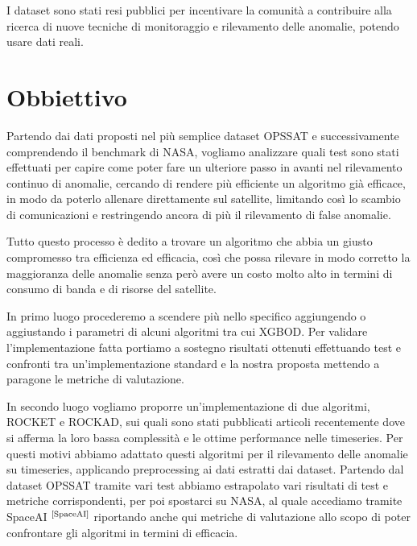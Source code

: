 I dataset sono stati resi pubblici per incentivare la comunità a contribuire alla ricerca di nuove tecniche di monitoraggio e rilevamento delle anomalie, potendo usare dati reali.

\section{Obbiettivo}
Partendo dai dati proposti nel più semplice dataset OPS\textunderscore SAT e successivamente comprendendo il benchmark di NASA, vogliamo analizzare quali test sono stati effettuati per capire come poter fare un ulteriore passo in avanti nel rilevamento continuo di anomalie, cercando di rendere più efficiente un algoritmo già efficace, in modo da poterlo allenare direttamente sul satellite, limitando così lo scambio di comunicazioni e restringendo ancora di più il rilevamento di false anomalie.

Tutto questo processo è dedito a trovare un algoritmo che abbia un giusto compromesso tra efficienza ed efficacia, così che possa rilevare in modo corretto la maggioranza delle anomalie senza però avere un costo molto alto in termini di consumo di banda e di risorse del satellite.

In primo luogo procederemo a scendere più nello specifico aggiungendo o aggiustando i parametri di alcuni algoritmi tra cui XGBOD.
Per validare l'implementazione fatta portiamo a sostegno risultati ottenuti effettuando test e confronti tra un'implementazione standard e la nostra proposta mettendo a paragone le metriche di valutazione.

In secondo luogo vogliamo proporre un'implementazione di due algoritmi, ROCKET e ROCKAD, sui quali sono stati pubblicati articoli recentemente dove si afferma la loro bassa complessità e le ottime performance nelle timeseries.
Per questi motivi abbiamo adattato questi algoritmi per il rilevamento delle anomalie su timeseries, applicando preprocessing ai dati estratti dai dataset. Partendo dal dataset OPS\textunderscore SAT tramite vari test abbiamo estrapolato vari risultati di test e metriche corrispondenti, per poi spostarci su NASA, al quale accediamo tramite SpaceAI $^{\text{\cite{SpaceAI}}}$ riportando anche qui metriche di valutazione allo scopo di poter confrontare gli algoritmi in termini di efficacia.
